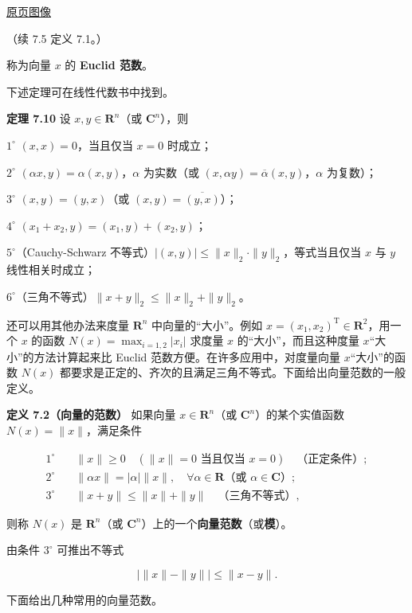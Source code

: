 \documentclass[
  10pt,
  fontset=fandol]{ctexart}
\begin{document}
\href{../../../source-images/pdf-200.jpeg}{原页图像}

（续 7.5 定义 7.1。）

称为向量 \(x\) 的 \textbf{Euclid 范数}。

下述定理可在线性代数书中找到。

\textbf{定理 7.10} 设 \(x,y\in\mathbf R^n\)（或 \(\mathbf C^n\)），则

\(1^\circ\) \((x,x)=0\)，当且仅当 \(x=0\) 时成立；

\(2^\circ\) \((\alpha x,y)=\alpha(x,y)\)，\(\alpha\) 为实数（或
\((x,\alpha y)=\overline\alpha(x,y)\)，\(\alpha\) 为复数）；

\(3^\circ\) \((x,y)=(y,x)\)（或 \((x,y)=\overline{(y,x)}\)）；

\(4^\circ\) \((x_1+x_2,y)=(x_1,y)+(x_2,y)\)；

\(5^\circ\)（Cauchy-Schwarz
不等式）\(|(x,y)|\leqslant\|x\|_2\cdot\|y\|_2\)，等式当且仅当 \(x\) 与
\(y\) 线性相关时成立；

\(6^\circ\)（三角不等式）\(\|x+y\|_2\leqslant\|x\|_2+\|y\|_2\)。

还可以用其他办法来度量 \(\mathbf R^n\) 中向量的``大小''。例如
\(x=(x_1,x_2)^{\mathrm T}\in\mathbf R^2\)，用一个 \(x\) 的函数
\(N(x)=\max_{i=1,2}|x_i|\) 求度量 \(x\) 的``大小''，而且这种度量
\(x\)``大小''的方法计算起来比 Euclid 范数方便。在许多应用中，对度量向量
\(x\)``大小''的函数 \(N(x)\)
都要求是正定的、齐次的且满足三角不等式。下面给出向量范数的一般定义。

\textbf{定义 7.2（向量的范数）} 如果向量 \(x\in\mathbf R^n\)（或
\(\mathbf C^n\)）的某个实值函数 \(N(x)=\|x\|\)，满足条件

\[
\begin{aligned}
1^\circ\quad &\|x\|\geqslant0\quad(\|x\|=0\text{ 当且仅当 }x=0)\quad\text{（正定条件）};\\
2^\circ\quad &\|\alpha x\|=|\alpha|\|x\|,\quad\forall\alpha\in\mathbf R\text{（或 }\alpha\in\mathbf C\text{）};\\
3^\circ\quad &\|x+y\|\leqslant\|x\|+\|y\|\quad\text{（三角不等式）},
\end{aligned}
\tag{7.5.1}
\]

则称 \(N(x)\) 是 \(\mathbf R^n\)（或
\(\mathbf C^n\)）上的一个\textbf{向量范数}（或\textbf{模}）。

由条件 \(3^\circ\) 可推出不等式

\[
\big|\|x\|-\|y\|\big|\leqslant\|x-y\|.
\tag{7.5.2}
\]

下面给出几种常用的向量范数。
\end{document}
